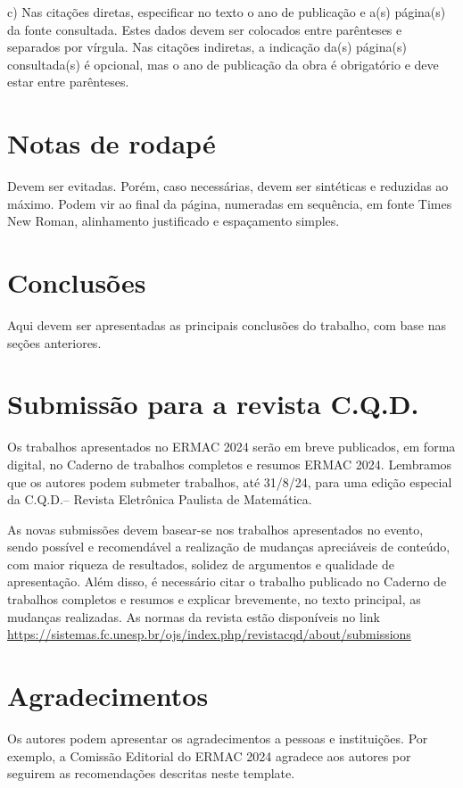 \documentclass[a4paper,11pt]{article}
\begin{document}
\vskip 0.2cm
c) Nas citações diretas, especificar no texto o ano de publicação e a(s) página(s) da fonte consultada. Estes dados devem ser colocados entre parênteses e separados por vírgula. Nas citações indiretas, a indicação da(s) página(s) consultada(s) é opcional, mas o ano de publicação da obra é obrigatório e deve estar entre parênteses.

\section*{Notas de rodapé}
Devem ser evitadas. Porém, caso necessárias, devem ser sintéticas e reduzidas ao máximo. Podem vir ao final da página, numeradas em sequência, em fonte Times New Roman, alinhamento justificado e espaçamento simples.

\vskip 0.2cm
\section*{Conclusões}
Aqui devem ser apresentadas as principais conclusões do trabalho, com base nas seções anteriores.

\section*{Submissão para a revista C.Q.D.}

Os trabalhos apresentados no ERMAC 2024 serão em breve publicados, em forma digital, no Caderno de trabalhos completos e resumos ERMAC 2024. Lembramos que os autores podem submeter trabalhos, até 31/8/24, para uma edição especial da C.Q.D.-- Revista Eletrônica Paulista de Matemática. 

As novas submissões devem basear-se nos trabalhos apresentados no evento, sendo possível e recomendável a realização de mudanças apreciáveis de conteúdo, com maior riqueza de resultados, solidez de argumentos e qualidade de apresentação.
Além disso, é necessário citar o trabalho publicado no Caderno de trabalhos completos e resumos e explicar brevemente, no texto principal, as mudanças realizadas.
As normas da revista estão disponíveis no link \url{https://sistemas.fc.unesp.br/ojs/index.php/revistacqd/about/submissions} 

\section*{Agradecimentos}
Os autores podem apresentar os agradecimentos a pessoas e instituições. Por exemplo, a Comissão Editorial do ERMAC 2024 agradece aos autores por seguirem as recomendações descritas neste template.
\end{document}
